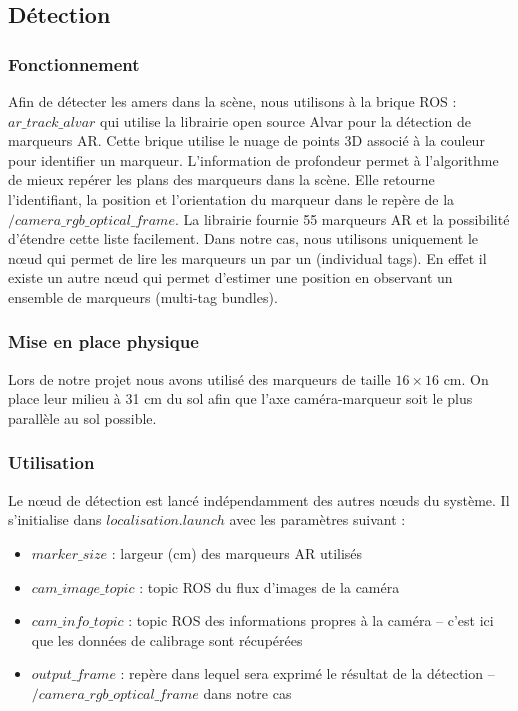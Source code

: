 \documentclass[10pt,a4paper]{article}
\begin{document}
\subsection{Détection}
\label{sec:detection}

\subsubsection{Fonctionnement}

Afin de détecter les amers dans la scène, nous utilisons à la brique ROS : $ar\_track\_alvar$ qui utilise la librairie open source Alvar pour la détection de marqueurs AR.
Cette brique utilise le nuage de points 3D associé à la couleur pour identifier un marqueur. L'information de profondeur permet à l'algorithme de mieux repérer les plans des marqueurs dans la scène. Elle retourne l'identifiant, la position et l'orientation du marqueur dans le repère de la $/camera\_rgb\_optical\_frame$. La librairie fournie 55 marqueurs AR et la possibilité d'étendre cette liste facilement. Dans notre cas, nous utilisons uniquement le nœud qui permet de lire les marqueurs un par un (individual tags). En effet il existe un autre nœud qui permet d'estimer une position en observant un ensemble de marqueurs (multi-tag bundles).

\subsubsection{Mise en place physique} 
Lors de notre projet nous avons utilisé des marqueurs de taille $16 \times 16$ cm. On place leur milieu à 31 cm du sol afin que l'axe caméra-marqueur soit le plus parallèle au sol possible.

\subsubsection{Utilisation}

 Le nœud de détection est lancé indépendamment des autres nœuds du système. Il s'initialise dans $localisation.launch$ avec les paramètres suivant : 
\begin{itemize}
\item $marker\_size$ : largeur (cm) des marqueurs AR utilisés
\item $cam\_image\_topic$ : topic ROS du flux d'images de la caméra
\item $cam\_info\_topic$ : topic ROS des informations propres à la caméra -- c'est ici que les données de calibrage sont récupérées
\item $output\_frame$ : repère dans lequel sera exprimé le résultat de la détection -- $/camera\_rgb\_optical\_frame$ dans notre cas
\end{itemize}
\end{document}
